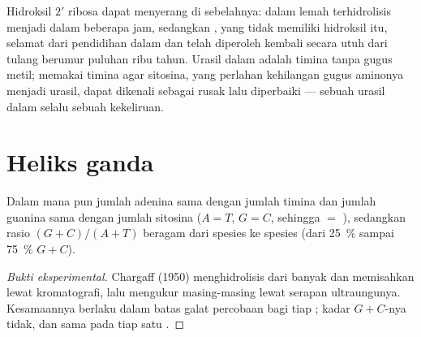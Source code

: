 \begin{example}\label{ex:b1:nucleic-acids:fragile}
Hidroksil $2'$ ribosa dapat menyerang  di sebelahnya:
dalam  lemah  terhidrolisis menjadi  dalam beberapa
jam, sedangkan , yang tidak memiliki hidroksil itu, selamat dari
pendidihan dalam  dan telah diperoleh kembali secara utuh dari
tulang berumur puluhan ribu tahun. Urasil dalam  adalah timina tanpa
gugus metil;  memakai timina agar sitosina, yang perlahan kehilangan
gugus aminonya menjadi urasil, dapat dikenali sebagai rusak lalu
diperbaiki --- sebuah urasil dalam  selalu sebuah kekeliruan.
\end{example}

\section{Heliks ganda}

\begin{proposition}\label{prop:b1:nucleic-acids:chargaff}
Dalam   mana pun jumlah adenina sama dengan jumlah timina
dan jumlah guanina sama dengan jumlah sitosina ($A = T$, $G = C$,
sehingga  $=$ ), sedangkan rasio $(G + C)/(A + T)$
beragam dari spesies ke spesies (dari \qty{25}{\%} sampai \qty{75}{\%}
$G + C$).
\end{proposition}
\begin{proof}[Bukti eksperimental]
Chargaff (1950) menghidrolisis  dari banyak  dan memisahkan
 lewat kromatografi, lalu mengukur masing-masing lewat serapan
ultraungunya. Kesamaannya berlaku dalam batas galat percobaan bagi tiap
; kadar $G + C$-nya tidak, dan sama pada tiap  satu
.
\end{proof}

